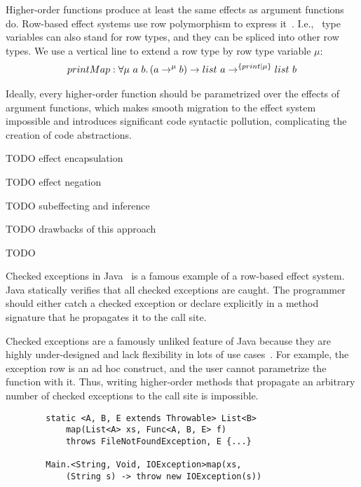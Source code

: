 \documentclass[conference]{IEEEtran}
\newcommand{\ap}{~}
\begin{document}
    Higher-order functions produce at least the same effects as argument functions do.
    Row-based effect systems use row polymorphism to express it~\cite{gaster1996polymorphic}.
    I.e., \ type variables can also stand for row types, and they can be spliced into other row types.
    We use a vertical line to extend a row type by row type variable $\mu$:
    \begin{multline*}
        printMap : \forall \mu \ap a \ap b\ldotp (a \to^\mu b) \to list \ap a \to^{\{print|\mu\}} list \ap b
    \end{multline*}

    Ideally, every higher-order function should be parametrized over the effects of argument functions, which makes smooth migration to the effect system impossible and introduces significant code syntactic pollution, complicating the creation of code abstractions.

    TODO effect encapsulation %

    TODO effect negation %

    TODO subeffecting and inference %

    TODO drawbacks of this approach %

    TODO~\cite{hillerstrom2016liberating} %

    Checked exceptions in Java~\cite{gosling2000java} is a famous example of a row-based effect system.
    Java statically verifies that all checked exceptions are caught.
    The programmer should either catch a checked exception or declare explicitly in a method signature that he propagates it to the call site.

    Checked exceptions are a famously unliked feature of Java because they are highly under-designed and lack flexibility in lots of use cases~\cite{checked-exceptions}.
    For example, the exception row is an ad hoc construct, and the user cannot parametrize the function with it.
    Thus, writing higher-order methods that propagate an arbitrary number of checked exceptions to the call site is impossible.

    \begin{verbatim}
        static <A, B, E extends Throwable> List<B>
            map(List<A> xs, Func<A, B, E> f)
            throws FileNotFoundException, E {...}

        Main.<String, Void, IOException>map(xs,
            (String s) -> throw new IOException(s))
    \end{verbatim}
\end{document}
